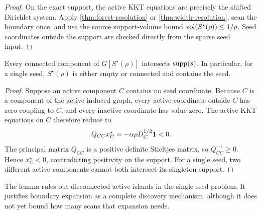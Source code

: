 \begin{proof}
On the exact support, the active KKT equations are precisely the shifted
Dirichlet system.  Apply \cref{thm:forest-resolution} or
\cref{thm:width-resolution}, scan the boundary once, and use the source
support-volume bound $\operatorname{vol}(S^\star(\rho))\leq1/\rho$.  Seed coordinates
outside the support are checked directly from the sparse seed input.
\end{proof}

\begin{lemma}
\label{lem:support-components}
Every connected component of $G[S^\star(\rho)]$ intersects $\operatorname{supp}(s)$.  In
particular, for a single seed, $S^\star(\rho)$ is either empty or connected
and contains the seed.
\end{lemma}

\begin{proof}
Suppose an active component $C$ contains no seed coordinate.  Because $C$ is
a component of the active induced graph, every active coordinate outside $C$
has zero coupling to $C$, and every inactive coordinate has value zero.  The
active KKT equations on $C$ therefore reduce to
\[
 Q_{CC}x_C^\star=-\alpha\rho D_C^{1/2}\mathbf{1}<0.
\]
The principal matrix $Q_{CC}$ is a positive definite Stieltjes matrix, so
$Q_{CC}^{-1}\geq0$.  Hence $x_C^\star<0$, contradicting positivity on the
support.  For a single seed, two different active components cannot both
intersect its singleton support.
\end{proof}

The lemma rules out disconnected active islands in the single-seed problem.
It justifies boundary expansion as a complete discovery mechanism, although
it does not yet bound how many scans that expansion needs.
